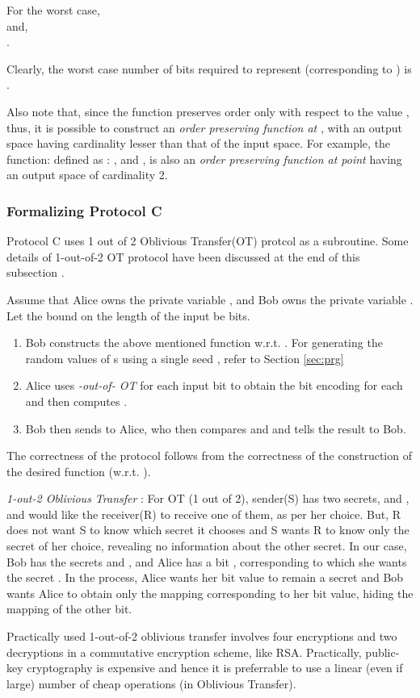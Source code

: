 \documentclass[11pt, letterpaper, romanappendices, onecolumn]{article}
\theoremstyle{plain}\newtheorem{thm}{Theorem}[section]
\theoremstyle{definition}
\theoremstyle{remark}
\begin{document}
\par For the worst case, \\
 and, \\
 .

\par Clearly, the worst case number of bits required to represent  (corresponding to ) is . \par Also note that, since the function preserves order only with respect to the value , thus, it is possible to construct an \textit{order preserving function at }, with an output space having cardinality lesser than that of the input space. For example, the function:  defined as :  , and  , is also an \textit{order preserving function at point } having an output space of cardinality 2. 

\subsubsection{Formalizing Protocol \textsf{C}}
Protocol \textsf{C} uses 1 out of 2 Oblivious Transfer(OT) protcol as a subroutine. Some details of 1-out-of-2 OT protocol \citet{rabin2005exchange} have been discussed at the end of this subsection . 
\par Assume that Alice owns the private variable , and Bob owns the private variable . Let the bound on the length of the input be  bits.
\begin{enumerate}
	\item Bob constructs the above mentioned function  w.r.t. . For generating the random values of s using a single seed , refer to Section \ref{sec:prg}
	\item Alice uses \textit{-out-of- OT} for each input bit  to obtain the bit encoding  for each  and then computes .
	\item Bob then sends  to Alice, who then compares  and  and tells the result to Bob.
\end{enumerate}

\par The correctness of the protocol follows from the correctness of the construction of the desired function  (w.r.t. ).

\par \textit{1-out-2 Oblivious Transfer} : For OT (1 out of 2), sender(S) has two secrets,  and , and would like the receiver(R) to receive one of them, as per her choice. But, R does not want S to know which secret it chooses and S wants R to know only the secret of her choice, revealing no information about the other secret. In our case, Bob has the secrets  and , and Alice has a bit , corresponding to which she wants the secret . In the process, Alice wants her bit value to remain a secret and Bob wants Alice to obtain only the mapping corresponding to her bit value, hiding the mapping of the other bit.
\par Practically used 1-out-of-2 oblivious transfer involves four encryptions and two decryptions in a commutative encryption scheme, like RSA. Practically, public-key cryptography is expensive and hence it is preferrable to use a linear (even if large) number of cheap operations (in Oblivious Transfer). 
\end{document}
